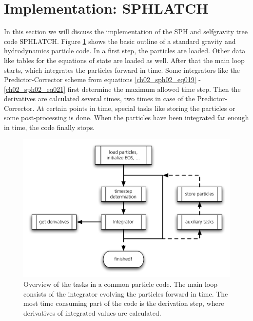 \section{Implementation: SPHLATCH}
In this section we will discuss the implementation of the SPH and selfgravity tree code SPHLATCH. Figure \ref{ch02_fig20} shows the basic outline of a standard gravity and hydrodynamics particle code. In a first step, the particles are loaded. Other data like tables for the equations of state are loaded as well. After that the main loop starts, which integrates the particles forward in time. Some integrators like the Predictor-Corrector scheme from equations \ref{ch02_sph02_eq019} - \ref{ch02_sph02_eq021} first determine the maximum allowed time step. Then the derivatives are calculated several times, two times in case of the Predictor-Corrector. At certain points in time, special tasks like storing the particles or some post-processing is done. When the particles have been integrated far enough in time, the code finally stops.

\begin{figure}[htbp]
\begin{center}
\includegraphics[scale=0.6]{20algo_overview.pdf}
\caption{Overview of the tasks in a common particle code. The main loop consists of the integrator evolving the particles forward in time. The most time consuming part of the code is the derivation step, where derivatives of integrated values are calculated.}
\label{ch02_fig20}
\end{center}
\end{figure}

